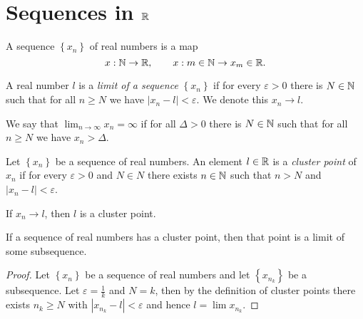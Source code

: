 \section{Sequences in $\mathbb{R}$}

\begin{definition}
	A sequence $\left\{ x_n \right\}$ of real numbers is a map
	\[
		x: \mathbb{N} \to \mathbb{R}, \qquad
		x: m \in \mathbb{N} \to x_m \in \mathbb{R}.
	\]
\end{definition}

\begin{definition}
	A real number $l$ is a \emph{limit of a sequence} $\left\{ x_n \right\}$ if
	for every $\varepsilon > 0$ there is $N \in \mathbb{N}$ such that for all $n \geq N$
	we have $\left\lvert x_n - l \right\rvert < \varepsilon$.
	We denote this $x_n \to l$.
\end{definition}

\begin{definition}
	We say that $\lim_{n \to \infty} x_n = \infty$
	if for all $\Delta > 0$ there is $N \in \mathbb{N}$ such that
	for all $n \geq N$ we have $x_n > \Delta$.
\end{definition}

\begin{definition}
	Let $\left\{ x_n \right\}$ be a sequence of real numbers.
	An element $l \in \mathbb{R}$ is a \emph{cluster point} of $x_n$
	if for every $\varepsilon > 0$ and $N \in N$
	there exists $n \in \mathbb{N}$ such that $n > N$ and
	$\left\lvert x_n - l \right\rvert < \varepsilon$.
\end{definition}

If $x_n \to l$, then $l$ is a cluster point.

\begin{lemma}[]
	If a sequence of real numbers has a cluster point, 
	then that point is a limit of some subsequence.
\end{lemma}

\begin{proof}
	Let $\left\{ x_n \right\}$ be a sequence of real numbers
	and let $\left\{ x_{n_k} \right\}$ be a subsequence.
	Let $\varepsilon = \frac1k$ and $N = k$, then by the definition of cluster
	points there exists $n_k \geq N$ with 
	$\left\lvert x_{n_k} - l \right\rvert < \varepsilon$
	and hence $l = \lim x_{n_k}$.
\end{proof}

